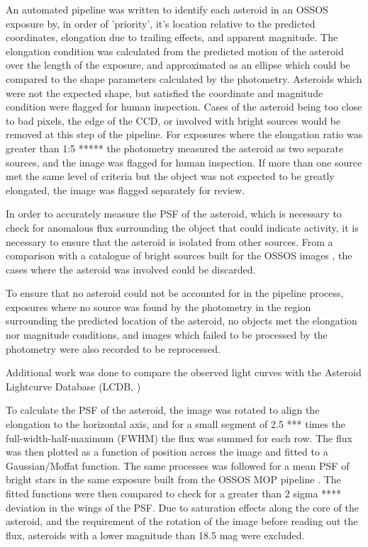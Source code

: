 \documentclass[iop,apj]{emulateapj}
\begin{document}
An automated pipeline was written to identify each asteroid in an OSSOS exposure by, in order of 'priority', it's location relative to the predicted coordinates,  elongation due to trailing effects, and apparent magnitude. The elongation condition was calculated from the predicted motion of the asteroid over the length of the exposure, and approximated as an ellipse which could be compared to the shape parameters calculated by the photometry. Asteroids which were not the expected shape, but satisfied the coordinate and magnitude condition were flagged for human inspection. Cases of the asteroid being too close to bad pixels, the edge of the CCD, or involved with bright sources would be removed at this step of the pipeline. For exposures where the elongation ratio was greater than 1:5 ***** the photometry measured the asteroid as two separate sources, and the image was flagged for human inspection. If more than one source met the same level of criteria but the object was not expected to be greatly elongated, the image was flagged separately for review.

In order to accurately measure the PSF of the asteroid, which is necessary to check for anomalous flux surrounding the object that could indicate activity, it is necessary to ensure that the asteroid is isolated from other sources. From a comparison with a catalogue of bright sources built for the OSSOS images \citep{ossos}, the cases where the asteroid was involved could be discarded.

To ensure that no asteroid could not be accounted for in the pipeline process, exposures where no source was found by the photometry in the region surrounding the predicted location of the asteroid, no objects met the elongation nor magnitude conditions, and images which failed to be processed by the photometry were also recorded to be reprocessed.

Additional work was done to compare the observed light curves with the Asteroid Lightcurve Database (LCDB, \citep{warner08})

To calculate the PSF of the asteroid, the image was rotated to align the elongation to the horizontal axis, and for a small segment of 2.5 *** times the full-width-half-maximum (FWHM) the flux was summed for each row. The flux was then plotted as a function of position across the image and fitted to a Gaussian/Moffat function. The same processes was followed for a mean PSF of bright stars in the same exposure built from the OSSOS MOP pipeline \citep{ossos}. The fitted functions were then compared to check for a greater than 2 sigma **** deviation in the wings of the PSF. Due to saturation effects along the core of the asteroid, and the requirement of the rotation of the image before reading out the flux, asteroids with a lower magnitude than 18.5 mag were excluded. 
\end{document}
